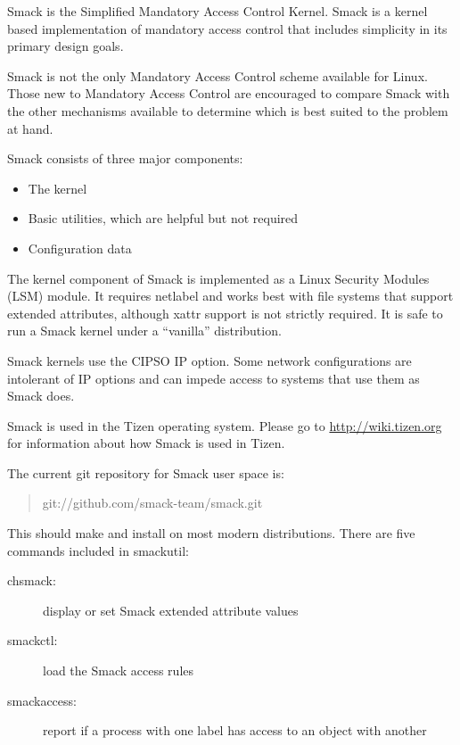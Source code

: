\documentclass[a4paper,8pt,english]{sphinxmanual}
\begin{document}
Smack is the Simplified Mandatory Access Control Kernel.
Smack is a kernel based implementation of mandatory access
control that includes simplicity in its primary design goals.

Smack is not the only Mandatory Access Control scheme
available for Linux. Those new to Mandatory Access Control
are encouraged to compare Smack with the other mechanisms
available to determine which is best suited to the problem
at hand.

Smack consists of three major components:
\begin{itemize}
\item {} 
The kernel

\item {} 
Basic utilities, which are helpful but not required

\item {} 
Configuration data

\end{itemize}

The kernel component of Smack is implemented as a Linux
Security Modules (LSM) module. It requires netlabel and
works best with file systems that support extended attributes,
although xattr support is not strictly required.
It is safe to run a Smack kernel under a ``vanilla'' distribution.

Smack kernels use the CIPSO IP option. Some network
configurations are intolerant of IP options and can impede
access to systems that use them as Smack does.

Smack is used in the Tizen operating system. Please
go to \href{http://wiki.tizen.org}{http://wiki.tizen.org} for information about how
Smack is used in Tizen.

The current git repository for Smack user space is:
\begin{quote}

git://github.com/smack-team/smack.git
\end{quote}

This should make and install on most modern distributions.
There are five commands included in smackutil:
\begin{description}
\item[{chsmack:}] \leavevmode
display or set Smack extended attribute values

\item[{smackctl:}] \leavevmode
load the Smack access rules

\item[{smackaccess:}] \leavevmode
report if a process with one label has access
to an object with another

\end{description}
\end{document}
